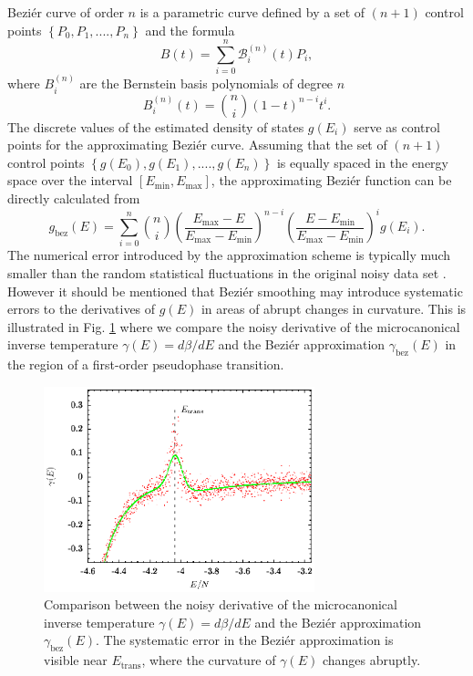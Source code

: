 \documentclass[12pt]{report}
\begin{document}
Bezi\'{e}r curve of order $n$ is a parametric curve defined by a set of $(n+1)$ control points $\left\lbrace P_{0},P_{1},....,P_{n}\right\rbrace$ and the formula 
%
\begin{equation}
\label{eq:beziereDefinition}
B(t) = \sum_{i=0}^{n}\mathcal{B}_{i}^{(n)}(t)P_{i},
\end{equation}
%
where ${B}_{i}^{(n)}$ are the Bernstein basis polynomials \cite{Lorentz1953} of degree $n$
%
\begin{equation}
\label{eq:BernsteinPoly}
{B}_{i}^{(n)}(t) = \binom{n}{i}(1-t)^{n-i}t^{i}.
\end{equation}
The discrete values of the estimated density of states $g(E_{i})$ serve as control points for the approximating Bezi\'{e}r curve. Assuming that the set of $(n+1)$ control points
\newline
$\left\lbrace g(E_{0}),g(E_{1}),....,g(E_{n})\right\rbrace$ is equally spaced in the energy space over the interval $[E_{\mathrm{min}},E_{\mathrm{max}}]$, the approximating Bezi\'{e}r function can be directly calculated from
%
\begin{equation}
g_{\mathrm{bez}}(E) = \sum_{i=0}^{n} \binom{n}{i} \left(\frac{E_{\mathrm{max}} - E}{E_{\mathrm{max}} - E_{\mathrm{min}}} \right)^{n-i} \left(\frac{E - E_{\mathrm{min}}}{E_{\mathrm{max}} - E_{\mathrm{min}}} \right)^{i} 
g(E_{i}).
\end{equation}
%
The numerical error introduced by the approximation scheme is typically much smaller than the random statistical fluctuations in the original noisy data set \cite{Bachmann2014}. However it should be mentioned that Bezi\'{e}r smoothing may introduce systematic errors to the derivatives of $g(E)$ in areas of abrupt changes in curvature.  This is illustrated in Fig. \ref{fig:Bezier} where we compare the noisy derivative of the microcanonical inverse temperature $\gamma(E) = d\beta/dE$ and the Bezi\'{e}r approximation $\gamma_{\mathrm{bez}}(E)$ in the region of a first-order pseudophase transition.
%
\begin{figure}
\center
\includegraphics[width = 0.7\textwidth]{chapter3Figs/bezierComparison.eps}
\caption{\label{fig:Bezier}%
Comparison between the noisy derivative of the microcanonical inverse temperature $\gamma(E) = d\beta/dE$ and the Bezi\'{e}r approximation $\gamma_{\mathrm{bez}}(E)$. The systematic error in the Bezi\'{e}r approximation is visible near $E_{\mathrm{trans}}$, where the curvature of $\gamma(E)$ changes abruptly.
}
\end{figure}
% 
\end{document}
